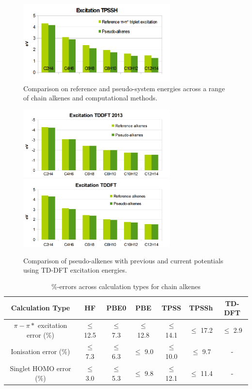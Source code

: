 \documentclass[journal=jctcce,manuscript=article]{achemso}
\begin{document}
\begin{figure}
\includegraphics[width=8cm]{tpssh_excitation}
\caption{Comparison on reference and pseudo-system energies across a range of chain alkenes and computational methods.}
\label{fig:alkenes_hf_dft}
\end{figure}
\begin{figure}
\includegraphics[width=8cm]{tddft_excitation_cd}
\includegraphics[width=8cm]{tddft_excitation}
\caption{Comparison of pseudo-alkenes with previous\cite{drujon_pseudopotentials_2013} and current potentials using TD-DFT excitation energies.}
\label{fig:alkenes_tddft}
\end{figure}

\begin{table}[ht]
\caption{\%-errors across calculation types for chain alkenes}
\begin{tabular}{c c c c c c c}
\hline\hline
Calculation Type & HF & PBE0 & PBE & TPSS & TPSSh & TD-DFT \\
\hline
\(\pi - \pi*\) excitation error (\%) & \(\leq\) 12.5 &\(\leq\) 7.3 & \(\leq\) 12.8 & \(\leq\) 14.1 & \(\leq\) 17.2 & \(\leq\) 2.9 \\
Ionisation error (\%) & \(\leq\) 7.3 & \(\leq\) 6.3 & \(\leq\) 9.0 & \(\leq\) 10.0 & \(\leq\) 9.7 & - \\
Singlet HOMO error (\%) & \(\leq\) 3.0 & \(\leq\) 5.3 & \(\leq\) 9.8 & \(\leq\) 12.1 & \(\leq\) 11.4 & - \\
\hline
\end{tabular}
\label{table:alkene_errors}
\end{table}
\end{document}
